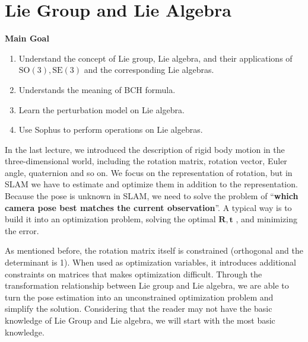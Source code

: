 \chapter{Lie Group and Lie Algebra}
\label{cpt:4}
\begin{mdframed}
    \textbf{Main Goal}
    \begin{enumerate}
        \item Understand the concept of Lie group, Lie algebra, and their applications of $ \mathrm{SO}( 3 ), \mathrm{SE}( 3 ) $ and the corresponding Lie algebras.
        \item Understands the meaning of BCH formula.
        \item Learn the perturbation model on Lie algebra.
        \item Use Sophus to perform operations on Lie algebras.
    \end{enumerate}
\end{mdframed}

In the last lecture, we introduced the description of rigid body motion in the three-dimensional world, including the rotation matrix, rotation vector, Euler angle, quaternion and so on. We focus on the representation of rotation, but in SLAM we have to estimate and optimize them in addition to the representation. Because the pose is unknown in SLAM, we need to solve the problem of ``\textbf {which camera pose best matches the current observation}''. A typical way is to build it into an optimization problem, solving the optimal $ \mathbf{R}, \mathbf{t}$ , and minimizing the error.

As mentioned before, the rotation matrix itself is constrained (orthogonal and the determinant is 1). When used as optimization variables, it introduces additional constraints on matrices that makes optimization difficult. Through the transformation relationship between Lie group and Lie algebra, we are able to turn the pose estimation into an unconstrained optimization problem and simplify the solution. Considering that the reader may not have the basic knowledge of Lie Group and Lie algebra, we will start with the most basic knowledge.

\newpage

